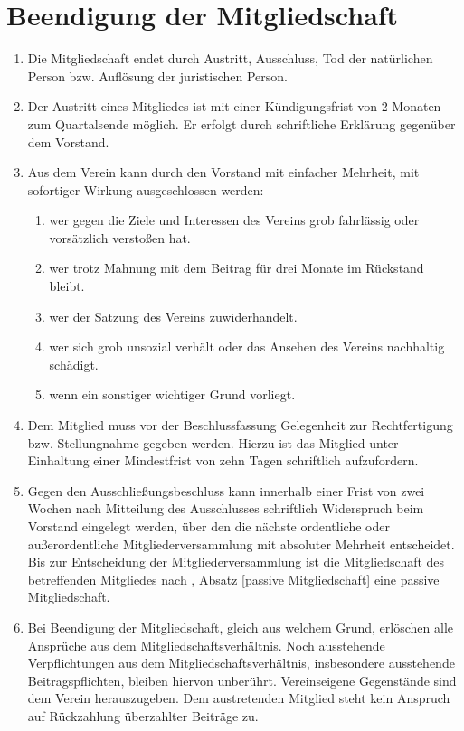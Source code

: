 \documentclass[a4paper,ngerman]{scrartcl}
\newcommand{\customref}[1]{\sectionref{#1}, Absatz \ref{#1}}
\begin{document}
\section{Beendigung der Mitgliedschaft}
\begin{enumerate}
\item Die Mitgliedschaft endet durch Austritt, Ausschluss, Tod der natürlichen Person bzw. Auflösung der juristischen Person.
\item Der Austritt eines Mitgliedes ist mit einer Kündigungsfrist von 2 Monaten zum Quartalsende möglich. Er erfolgt durch schriftliche Erklärung gegenüber dem Vorstand.
\item Aus dem Verein kann durch den Vorstand mit einfacher Mehrheit, mit sofortiger Wirkung ausgeschlossen werden: 
\begin{enumerate}
\item wer gegen die Ziele und Interessen des Vereins grob fahrlässig oder vorsätzlich verstoßen hat. 
\item wer trotz Mahnung mit dem Beitrag für drei Monate im Rückstand bleibt.
\item wer der Satzung des Vereins zuwiderhandelt.
\item wer sich grob unsozial verhält oder das Ansehen des Vereins nachhaltig schädigt.
\item wenn ein sonstiger wichtiger Grund vorliegt.
\end{enumerate}
\item Dem Mitglied muss vor der Beschlussfassung Gelegenheit zur Rechtfertigung bzw. Stellungnahme gegeben werden. Hierzu ist das Mitglied unter Einhaltung einer Mindestfrist von zehn Tagen schriftlich aufzufordern.
\item Gegen den Ausschließungsbeschluss kann innerhalb einer Frist von zwei Wochen nach Mitteilung des Ausschlusses schriftlich Widerspruch beim Vorstand eingelegt werden, über den die nächste ordentliche oder außerordentliche Mitgliederversammlung mit absoluter Mehrheit entscheidet. Bis zur Entscheidung der Mitgliederversammlung ist die Mitgliedschaft des betreffenden Mitgliedes nach \customref{passive Mitgliedschaft} eine passive Mitgliedschaft.
\item Bei Beendigung der Mitgliedschaft, gleich aus welchem Grund, erlöschen alle Ansprüche aus dem Mitgliedschaftsverhältnis. Noch ausstehende Verpflichtungen aus dem Mitgliedschaftsverhältnis, insbesondere ausstehende Beitragspflichten, bleiben hiervon unberührt. Vereinseigene Gegenstände sind dem Verein herauszugeben. 
Dem austretenden Mitglied steht kein Anspruch auf Rückzahlung überzahlter Beiträge zu.
\end{enumerate}
\end{document}
